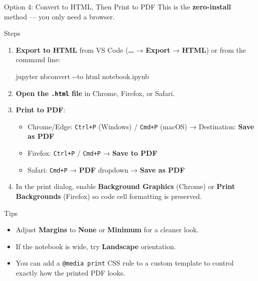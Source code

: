 \documentclass[
  ignorenonframetext,
  aspectratio=169,
]{beamer}
\newenvironment{Shaded}{\begin{snugshade}}{\end{snugshade}}
\newcommand{\AttributeTok}[1]{\textcolor[rgb]{0.40,0.45,0.13}{#1}}
\newcommand{\ExtensionTok}[1]{\textcolor[rgb]{0.00,0.23,0.31}{#1}}
\newcommand{\NormalTok}[1]{\textcolor[rgb]{0.00,0.23,0.31}{#1}}
\providecommand{\tightlist}{%
  \setlength{\itemsep}{0pt}\setlength{\parskip}{0pt}}
\begin{document}
\begin{frame}[fragile]{Option 4: Convert to HTML, Then Print to PDF}
\protect{}\label{option-4-convert-to-html-then-print-to-pdf}
This is the \textbf{zero-install} method --- you only need a browser.

\begin{block}{Steps}
\protect{}\label{steps-3}
\begin{enumerate}
\item
  \textbf{Export to HTML} from VS Code (\textbf{\ldots{}} →
  \textbf{Export} → \textbf{HTML}) or from the command line:

\begin{Shaded}
\begin{Highlighting}[]
\ExtensionTok{jupyter}\NormalTok{ nbconvert }\AttributeTok{{-}{-}to}\NormalTok{ html notebook.ipynb}
\end{Highlighting}
\end{Shaded}
\item
  \textbf{Open the \texttt{.html} file} in Chrome, Firefox, or Safari.
\item
  \textbf{Print to PDF}:

  \begin{itemize}
  \tightlist
  \item
    Chrome/Edge: \texttt{Ctrl+P} (Windows) / \texttt{Cmd+P} (macOS) →
    Destination: \textbf{Save as PDF}
  \item
    Firefox: \texttt{Ctrl+P} / \texttt{Cmd+P} → \textbf{Save to PDF}
  \item
    Safari: \texttt{Cmd+P} → \textbf{PDF} dropdown → \textbf{Save as
    PDF}
  \end{itemize}
\item
  In the print dialog, enable \textbf{Background Graphics} (Chrome) or
  \textbf{Print Backgrounds} (Firefox) so code cell formatting is
  preserved.
\end{enumerate}
\end{block}

\begin{block}{Tips}
\protect{}\label{tips}
\begin{itemize}
\tightlist
\item
  Adjust \textbf{Margins} to \textbf{None} or \textbf{Minimum} for a
  cleaner look.
\item
  If the notebook is wide, try \textbf{Landscape} orientation.
\item
  You can add a \texttt{@media\ print} CSS rule to a custom template to
  control exactly how the printed PDF looks.
\end{itemize}
\end{block}
\end{frame}
\end{document}
